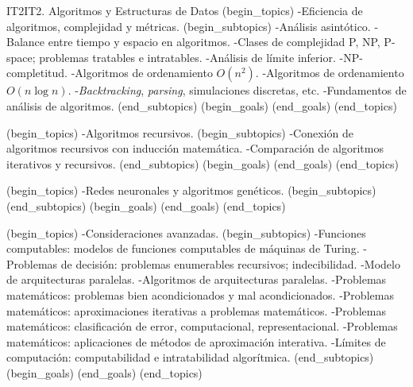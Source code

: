 \begin{BKL2}{IT2}{IT2. Algoritmos y Estructuras de Datos}
(begin_topics)
-Eficiencia de algoritmos, complejidad y métricas.
(begin_subtopics)
-Análisis asintótico.
-Balance entre tiempo y espacio en algoritmos.
-Clases de complejidad P, NP, P-space; problemas tratables e intratables.
-Análisis de límite inferior.
-NP-completitud.
-Algoritmos de ordenamiento $O(n^2)$.
-Algoritmos de ordenamiento $O(n\log n)$.
-{\it Backtracking}, {\it parsing}, simulaciones discretas, etc.
-Fundamentos de análisis de algoritmos.
(end_subtopics)
(begin_goals)
(end_goals)
(end_topics)

(begin_topics)
-Algoritmos recursivos.
(begin_subtopics)
-Conexión de algoritmos recursivos con inducción matemática.
-Comparación de algoritmos iterativos y recursivos.
(end_subtopics)
(begin_goals)
(end_goals)
(end_topics)

(begin_topics)
-Redes neuronales y algoritmos genéticos.
(begin_subtopics)
(end_subtopics)
(begin_goals)
(end_goals)
(end_topics)

(begin_topics)
-Consideraciones avanzadas.
(begin_subtopics)
-Funciones computables: modelos de funciones computables de máquinas de Turing.
-Problemas de decisión: problemas enumerables recursivos; indecibilidad.
-Modelo de arquitecturas paralelas.
-Algoritmos de arquitecturas paralelas.
-Problemas matemáticos: problemas bien acondicionados y mal acondicionados.
-Problemas matemáticos: aproximaciones iterativas a problemas matemáticos.
-Problemas matemáticos: clasificación de error, computacional, representacional.
-Problemas matemáticos: aplicaciones de métodos de aproximación interativa.
-Límites de computación: computabilidad e intratabilidad algorítmica.
(end_subtopics)
(begin_goals)
(end_goals)
(end_topics)
\end{BKL2}

